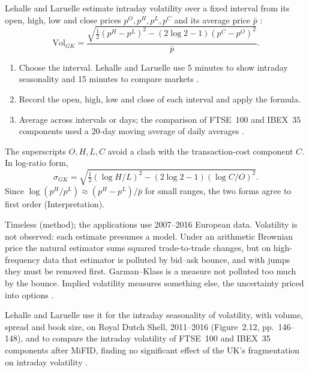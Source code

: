 \begin{qfmethod}\label{meth:garman-klass-volatility}
 Lehalle and Laruelle estimate intraday volatility over a fixed interval from its open, high, low and close prices $p^O,p^H,p^L,p^C$ and its average price $\bar p$ \citep[chap.~2, sec.~2.5.1, p.~172]{alpha-laruelle}:
\[ \mathrm{Vol}_{GK}=\frac{\sqrt{\tfrac12\left(p^H-p^L\right)^2-(2\log2-1)\left(p^C-p^O\right)^2}}{\bar p}. \]
\begin{enumerate}
\item Choose the interval. Lehalle and Laruelle use 5 minutes to show intraday seasonality and 15 minutes to compare markets \citep[same chap., secs.~2.2 and~2.5.1, pp.~146 and~172]{alpha-laruelle}.
\item Record the open, high, low and close of each interval and apply the formula.
\item Average across intervals or days; the comparison of FTSE~100 and IBEX~35 components used a 20-day moving average of daily averages \citep[same chap., sec.~2.5.1, p.~172]{alpha-laruelle}.
\end{enumerate}

 The superscripts $O,H,L,C$ avoid a clash with the transaction-cost component $C$. In log-ratio form,
\[
\sigma_{GK}=\sqrt{\tfrac12(\log H/L)^2-(2\log2-1)(\log C/O)^2}.
\]
Since $\log(p^H/p^L)\approx(p^H-p^L)/\bar p$ for small ranges, the two forms agree to first order (Interpretation).

 Timeless (method); the applications use 2007--2016 European data. Volatility is not observed: each estimate presumes a model. Under an arithmetic Brownian price the natural estimator sums squared trade-to-trade changes, but on high-frequency data that estimator is polluted by bid--ask bounce, and with jumps they must be removed first. Garman--Klass is a measure not polluted too much by the bounce. Implied volatility measures something else, the uncertainty priced into options \citep[same chap., sec.~2.2, pp.~146--147]{alpha-laruelle}.

 Lehalle and Laruelle use it for the intraday seasonality of volatility, with volume, spread and book size, on Royal Dutch Shell, 2011--2016 (Figure~2.12, pp.~146--148), and to compare the intraday volatility of FTSE~100 and IBEX~35 components after MiFID, finding no significant effect of the UK's fragmentation on intraday volatility \citep[same chap., sec.~2.5.1, pp.~172--174]{alpha-laruelle}.


\end{qfmethod}
